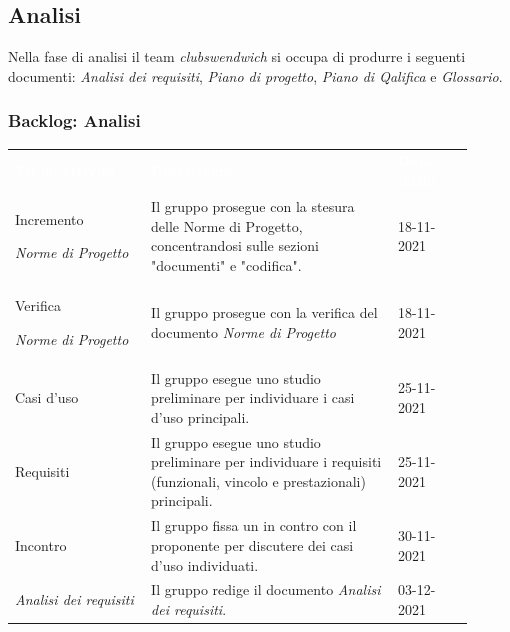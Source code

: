 \newpage
\subsection{Analisi}
Nella fase di analisi il team \textit{clubswendwich} si occupa di produrre i seguenti documenti: \textit{Analisi dei requisiti}, \textit{Piano di progetto}, \textit{Piano di Qalifica} e \textit{Glossario}.

\subsubsection{Backlog: Analisi}
{\renewcommand{\arraystretch}{1.5}
\begin{longtable}{p{0.27\linewidth}p{0.49\linewidth}p{0.15\linewidth}}
	\rowcolor[RGB]{33, 73, 50}
	\textcolor{white}{\textbf{Titolo attività}} & \textcolor{white}{\textbf{Descrizione}} & \textcolor{white}{\textbf{Data inizio}}\\
    
    \rowcolor[RGB]{216, 235, 171}
    Incremento \par \textit{Norme di Progetto} & Il gruppo prosegue con la stesura delle Norme di Progetto, concentrandosi sulle sezioni "documenti" e "codifica". & 18-11-2021\\

    \rowcolor[RGB]{233, 245, 206}
    Verifica \par \textit{Norme di Progetto} & Il gruppo prosegue con la verifica del documento \textit{Norme di Progetto} & 18-11-2021\\
    
    \rowcolor[RGB]{216, 235, 171}
    Casi d'uso & Il gruppo esegue uno studio preliminare per individuare i casi d'uso principali. & 25-11-2021\\

    \rowcolor[RGB]{233, 245, 206}
    Requisiti & Il gruppo esegue uno studio preliminare per individuare i requisiti (funzionali, vincolo e prestazionali) principali. & 25-11-2021\\

    \rowcolor[RGB]{216, 235, 171}
    Incontro & Il gruppo fissa un in contro con il proponente per discutere dei casi d'uso individuati. & 30-11-2021\\ 
    
    \rowcolor[RGB]{233, 245, 206}
    \textit{Analisi dei requisiti} & Il gruppo redige il documento \textit{Analisi dei requisiti}. & 03-12-2021\\


\end{longtable}}
